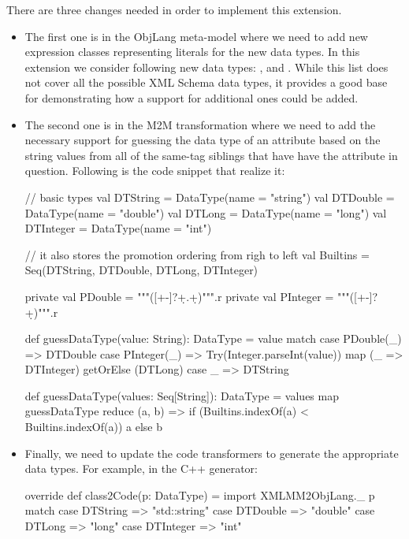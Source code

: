 There are three changes needed in order to implement this extension.
\begin{itemize}[(1)]
	\item The first one is in the ObjLang meta-model where we need to add new expression classes representing literals for the new data types.
	In this extension we consider following new data types: ,  and .
	While this list does not cover all the possible XML Schema data types, it provides a good base for demonstrating how a support for additional ones could be added.

	\item The second one is in the M2M transformation where we need to add the necessary support for guessing the data type of an attribute based on the string values from all of the same-tag siblings that have have the attribute in question.
	Following is the code snippet that realize it:
	\begin{scalacode}
	  // basic types
	  val DTString = DataType(name = "string")
	  val DTDouble = DataType(name = "double")
	  val DTLong = DataType(name = "long")
	  val DTInteger = DataType(name = "int")

	  // it also stores the promotion ordering from righ to left
	  val Builtins = Seq(DTString, DTDouble, DTLong, DTInteger)

	  private val PDouble = """([+-]?\d+.\d+)""".r
	  private val PInteger = """([+-]?\d+)""".r

	  def guessDataType(value: String): DataType = value match {
	    case PDouble(_) => DTDouble
	    case PInteger(_) => Try(Integer.parseInt(value)) map (_ => DTInteger) getOrElse (DTLong)
	    case _ => DTString
	  }

	  def guessDataType(values: Seq[String]): DataType =
	    values map guessDataType reduce { (a, b) =>
	      if (Builtins.indexOf(a) < Builtins.indexOf(a)) a else b
	    }
	\end{scalacode}

	\item Finally, we need to update the code transformers to generate the appropriate data types.
	For example, in the C++ generator:
	\begin{scalacode}
override def class2Code(p: DataType) = {
  import XMLMM2ObjLang._
  p match {
    case DTString => "std::string"
    case DTDouble => "double"
    case DTLong => "long"
    case DTInteger => "int"
  }
}		
	\end{scalacode}

\end{itemize}




